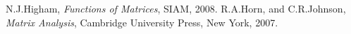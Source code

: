 \documentclass[letterpaper, 10pt, conference]{ieeeconf}  %
\begin{document}
\begin{thebibliography}{99}






N.J.Higham,
\emph{Functions of Matrices}, SIAM, 2008.
R.A.Horn, and C.R.Johnson,
\textit{Matrix Analysis},
Cambridge
University Press, New York, 2007.


\end{thebibliography}
\end{document}
